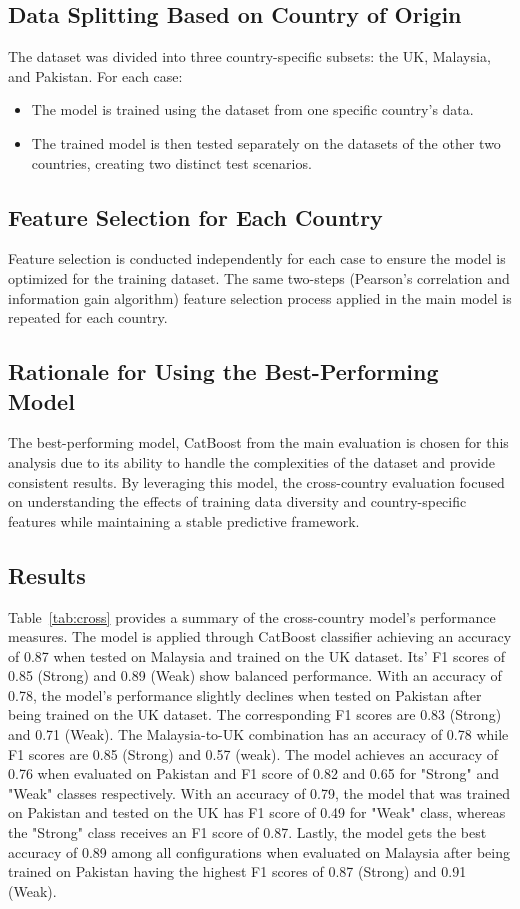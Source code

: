 \documentclass[pt]{article}  %
\begin{document}
	\subsection{Data Splitting Based on Country of Origin }
The dataset was divided into three country-specific subsets: the UK, Malaysia, and Pakistan. For each case:
	\begin{itemize}
	    \item The model is trained using the dataset from one specific country's data.
	    \item The trained model is then tested separately on the datasets of the other two countries, creating two distinct test scenarios.
	\end{itemize}

\subsection{Feature Selection for Each Country } Feature selection is conducted independently for each case to ensure the model is optimized for the training dataset. The same two-steps (Pearson's correlation and information gain algorithm) feature selection process applied in the main model is repeated for each country. 
\subsection{Rationale for Using the Best-Performing Model }The best-performing model, CatBoost from the main evaluation is chosen for this analysis due to its ability to handle the complexities of the dataset and provide consistent results. By leveraging this model, the cross-country evaluation focused on understanding the effects of training data diversity and country-specific features while maintaining a stable predictive framework.

\subsection{Results}
Table~\ref{tab:cross} provides a summary of the cross-country model's performance measures. The model is applied through CatBoost classifier achieving an accuracy of 0.87 when tested on Malaysia and trained on the UK dataset. Its' F1 scores of 0.85 (Strong) and 0.89 (Weak) show balanced performance. With an accuracy of 0.78, the model's performance slightly declines when tested on Pakistan after being trained on the UK dataset. The corresponding F1 scores are 0.83 (Strong) and 0.71 (Weak).
The Malaysia-to-UK combination has an accuracy of 0.78 while F1 scores are 0.85 (Strong) and 0.57 (weak). The model achieves an accuracy of 0.76 when evaluated on Pakistan and F1 score of 0.82 and 0.65 for "Strong" and "Weak" classes respectively.
With an accuracy of 0.79, the model that was trained on Pakistan and tested on the UK has F1 score of 0.49 for "Weak" class, whereas the "Strong" class receives an F1 score of 0.87.
Lastly, the model gets the best accuracy of 0.89 among all configurations when evaluated on Malaysia after being trained on Pakistan having the highest F1 scores of 0.87 (Strong) and 0.91 (Weak). \vspace{0.5cm}
\end{document}
